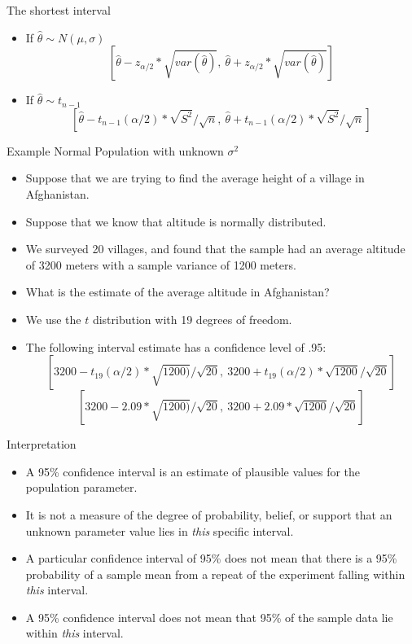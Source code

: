 \documentclass{beamer}
\numberwithin{equation}{section}
\begin{document}
\begin{frame}{The shortest interval}
\begin{itemize}
\item If $\hat{\theta}\sim N(\mu, \sigma)$
$$[\hat{\theta}-z_{\alpha/2} *\sqrt{var(\hat{\theta})},\ \hat{\theta}+z_{\alpha/2}*\sqrt{var(\hat{\theta})}]$$\pause
\item If $\hat{\theta}\sim t_{n-1}$
$$[\hat{\theta}-t_{n-1}(\alpha/2) *\sqrt{S^2}/\sqrt{n},\ \hat{\theta}+t_{n-1}(\alpha/2) *\sqrt{S^2}/\sqrt{n}]$$

\end{itemize}

\end{frame}


\begin{frame}{Example Normal Population with unknown $\sigma^2$}
\begin{itemize}
\item Suppose that we are trying to find the average height of a village in Afghanistan.\pause
\item Suppose that we know that altitude is normally distributed. \pause
\item We surveyed 20 villages, and found that the sample had an average altitude of 3200 meters with a sample variance of 1200 meters.\pause
\item What is the estimate of the average altitude in Afghanistan?\pause
\item We use the $t$ distribution with 19 degrees of freedom.
\item The following interval \alert{estimate} has a confidence level of .95:
$$[3200-t_{19}(\alpha/2) *\sqrt{1200)}/\sqrt{20},\ 3200+t_{19}(\alpha/2) *\sqrt{1200}/\sqrt{20}]$$\pause
$$[3200-2.09*\sqrt{1200)}/\sqrt{20},\ 3200+2.09 *\sqrt{1200}/\sqrt{20}]$$

\end{itemize}
\end{frame}

\begin{frame}{Interpretation}
\begin{itemize}
\item A 95\% confidence interval is an estimate of plausible values for the population parameter.  \pause
\item It is not a measure of the degree of probability, belief, or support that an unknown parameter value lies in \emph{this} specific interval. \pause 
\item A particular confidence interval of 95\%  does not mean that there is a 95\% probability of a sample mean from a repeat of the experiment falling within \emph{this} interval.
\item A 95\% confidence interval does not mean that 95\% of the sample data lie within \emph{this} interval.
\end{itemize}
\end{frame}
\end{document}
